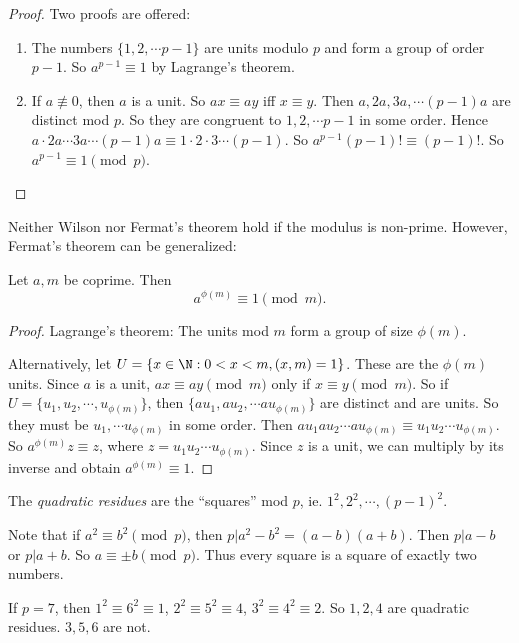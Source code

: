 \documentclass[a4paper]{article}
\begin{document}
  \begin{proof}
    Two proofs are offered:
    \begin{enumerate}
      \item The numbers $\{1, 2, \cdots p - 1\}$ are units modulo $p$ and form a group of order $p - 1$. So $a^{p - 1} \equiv 1$ by Lagrange's theorem.
      \item If $a\not\equiv 0$, then $a$ is a unit. So $ax \equiv ay$ iff $x\equiv y$. Then $a, 2a, 3a, \cdots (p - 1)a$ are distinct mod $p$. So they are congruent to $1, 2, \cdots p -1$ in some order. Hence $a\cdot 2a\cdots 3a\cdots (p - 1)a\equiv 1\cdot 2\cdot 3 \cdots (p - 1)$. So $a^{p - 1}(p - 1)! \equiv (p - 1)!$. So $a^{p - 1} \equiv 1\pmod p$.
    \end{enumerate}
  \end{proof}
  \note Neither Wilson nor Fermat's theorem hold if the modulus is non-prime. However, Fermat's theorem can be generalized:
  \begin{thm}
    Let $a, m$ be coprime. Then 
    \[
      a^{\phi(m)} \equiv 1\pmod m.
    \]
  \end{thm}

  \begin{proof}
    Lagrange's theorem: The units mod $m$ form a group of size $\phi(m)$.

    Alternatively, let $U = \{x\in \N: 0 < x < m, (x, m) = 1\}$. These are the $\phi(m)$ units. Since $a$ is a unit, $ax\equiv ay \pmod m$ only if $x\equiv y\pmod m$. So if $U = \{u_1, u_2, \cdots , u_{\phi(m)}\}$, then $\{au_1, au_2, \cdots au_{\phi(m)}\}$ are distinct and are units. So they must be $u_1, \cdots u_{\phi(m)}$ in some order. Then $au_1au_2\cdots au_{\phi(m)} \equiv u_1u_2\cdots u_{\phi(m)}$. So $a^{\phi(m)}z \equiv z$, where $z = u_1u_2\cdots u_{\phi(m)}$. Since $z$ is a unit, we can multiply by its inverse and obtain $a^{\phi(m)} \equiv 1$.
  \end{proof}

  \begin{defi}
    The \emph{quadratic residues} are the ``squares'' mod $p$, ie. $1^2, 2^2, \cdots, (p - 1)^2$.
  \end{defi}

  Note that if $a^2 \equiv b^2\pmod p$, then $p | a^2 - b^2 = (a - b)(a + b)$. Then $p | a - b$ or $p | a + b$. So $a\equiv \pm b\pmod p$. Thus every square is a square of exactly two numbers.

  \begin{eg}
    If $p = 7$, then $1^2 \equiv 6^2 \equiv 1$, $2^2 \equiv 5^2 \equiv 4$, $3^2 \equiv 4^2 \equiv 2$. So $1, 2, 4$ are quadratic residues. $3, 5, 6$ are not.
  \end{eg}
\end{document}
